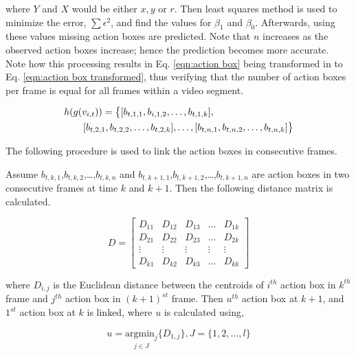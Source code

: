 where $Y$ and $X$ would be either $x,y$ or $r$. Then least squares method is used to minimize the error, $\sum{\epsilon^2}$, and find the
values for $\beta_{1}$ and $\beta_{0}$. Afterwards, using these values missing action boxes are predicted.
Note that $n$ increases as the observed action boxes
increase; hence the prediction becomes more accurate. Note how this processing results in Eq. \ref{eqn:action box}
being transformed in to Eq. \ref{eqn:action box transformed},
thus verifying that the number of action boxes per frame is equal for all frames within a video segment.

\begin{equation}
\label{eqn:action box transformed}
\begin{split}
\MoveEqLeft
 h(g(v_{i,t})) = \big\{[b_{t,1,1},b_{i,1,2},\dots,b_{t,1,k}],\\
 & [b_{t,2,1},b_{t,2,2},\dots,b_{t,2,k}],\dots,[b_{t,n,1},b_{t,n,2},\dots,b_{t,n,k}]\big\}
\end{split}
\end{equation}


The following procedure is used to link the action boxes in consecutive frames.

Assume $b_{t,k,1}$,$b_{t,k,2}$,\dots,$b_{t,k,n}$ and $b_{t,k+1,1}$,$b_{t,k+1,2}$,\dots,$b_{t,k+1,n}$  are action boxes in two
consecutive frames at time $k$ and $k+1$. Then the following distance matrix is calculated.



\begin{equation}
D=\begin{bmatrix}
    D_{11}       & D_{12} & D_{13} & \dots & D_{1k} \\
    D_{21}       & D_{22} & D_{23} & \dots & D_{2k} \\
    \vdots       & \vdots & \vdots & \vdots & \vdots \\
    D_{k1}       & D_{k2} & D_{k3} & \dots & D_{kk}
\end{bmatrix}
\end{equation}


where $D_{i,j}$ is the Euclidean distance between the centroids of $i^{th}$ action box in $k^{th}$ frame and $j^{th}$ action box in $(k+1)^{st}$ frame.
Then $u^{th}$ action box at $k+1$, and $1^{st}$ action box at $k$ is linked, where $u$ is calculated using,


\begin{equation}
u=\underset{j\in J}{\mathrm{argmin}_j}\{D_{1,j}\}, J=\{1,2,\dots,l\}
\label{link eq}
\end{equation}

